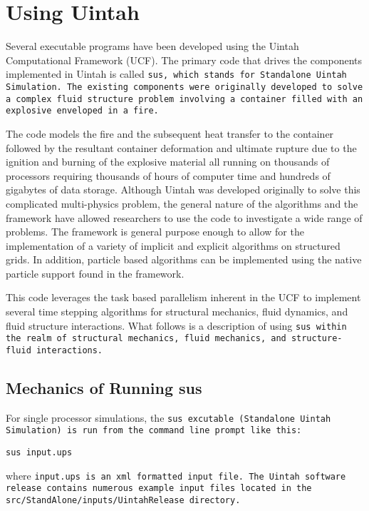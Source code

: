 \chapter{Using Uintah} \label{Chapter:UCF}

Several executable programs have been developed using the Uintah
Computational Framework (UCF).  The primary code that drives the
components implemented in Uintah is called \tt sus, \normalfont which
stands for Standalone Uintah Simulation.  The existing components were
originally developed to solve a complex fluid structure problem
involving a container filled with an explosive enveloped in a fire.

The code models the fire and the subsequent heat transfer to the
container followed by the resultant container deformation and ultimate
rupture due to the ignition and burning of the explosive material all
running on thousands of processors requiring thousands of hours of
computer time and hundreds of gigabytes of data storage.  Although
Uintah was developed originally to solve this complicated
multi-physics problem, the general nature of the algorithms and the
framework have allowed researchers to use the code to investigate a
wide range of problems.  The framework is general purpose enough to
allow for the implementation of a variety of implicit and explicit
algorithms on structured grids.  In addition, particle based
algorithms can be implemented using the native particle support found
in the framework.

This code leverages the task based parallelism inherent in the UCF to
implement several time stepping algorithms for structural mechanics,
fluid dynamics, and fluid structure interactions.  What follows is a
description of using \tt sus \normalfont within the realm of
structural mechanics, fluid mechanics, and structure-fluid
interactions.


\section{Mechanics of Running sus}

For single processor simulations, the \tt sus \normalfont excutable
(Standalone Uintah Simulation) is run from the command line prompt
like this:
\begin{Verbatim}[fontsize=\footnotesize]
  sus input.ups
\end{Verbatim}
where \tt input.ups \normalfont is an xml formatted input file.  The
Uintah software release contains numerous example input files located
in the \tt src/StandAlone/inputs/UintahRelease \normalfont directory.

